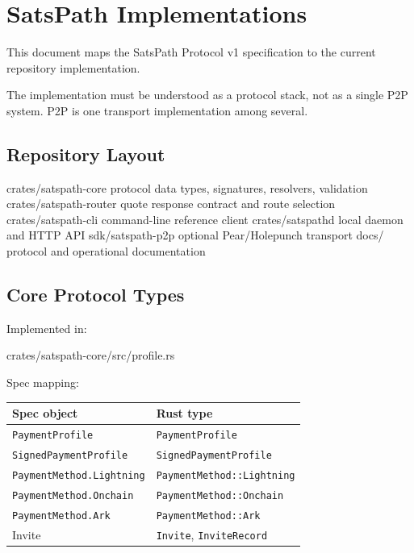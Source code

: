 \documentclass[
]{article}
\author{}
\date{}
\newenvironment{Shaded}{}{}
\newcommand{\NormalTok}[1]{#1}
\begin{document}
\hypertarget{satspath-implementations}{%
\section{SatsPath Implementations}\label{satspath-implementations}}

This document maps the SatsPath Protocol v1 specification to the current
repository implementation.

The implementation must be understood as a protocol stack, not as a
single P2P system. P2P is one transport implementation among several.

\hypertarget{repository-layout}{%
\subsection{Repository Layout}\label{repository-layout}}

\begin{Shaded}
\begin{Highlighting}[]
\NormalTok{crates/satspath{-}core      protocol data types, signatures, resolvers, validation}
\NormalTok{crates/satspath{-}router    quote response contract and route selection}
\NormalTok{crates/satspath{-}cli       command{-}line reference client}
\NormalTok{crates/satspathd          local daemon and HTTP API}
\NormalTok{sdk/satspath{-}p2p          optional Pear/Holepunch transport}
\NormalTok{docs/                     protocol and operational documentation}
\end{Highlighting}
\end{Shaded}

\hypertarget{core-protocol-types}{%
\subsection{Core Protocol Types}\label{core-protocol-types}}

Implemented in:

\begin{Shaded}
\begin{Highlighting}[]
\NormalTok{crates/satspath{-}core/src/profile.rs}
\end{Highlighting}
\end{Shaded}

Spec mapping:

\begin{longtable}[]{@{}ll@{}}
\toprule\noalign{}
Spec object & Rust type \\
\midrule\noalign{}
\endhead
\bottomrule\noalign{}
\endlastfoot
\texttt{PaymentProfile} & \texttt{PaymentProfile} \\
\texttt{SignedPaymentProfile} & \texttt{SignedPaymentProfile} \\
\texttt{PaymentMethod.Lightning} & \texttt{PaymentMethod::Lightning} \\
\texttt{PaymentMethod.Onchain} & \texttt{PaymentMethod::Onchain} \\
\texttt{PaymentMethod.Ark} & \texttt{PaymentMethod::Ark} \\
Invite & \texttt{Invite}, \texttt{InviteRecord} \\
\end{longtable}
\end{document}
